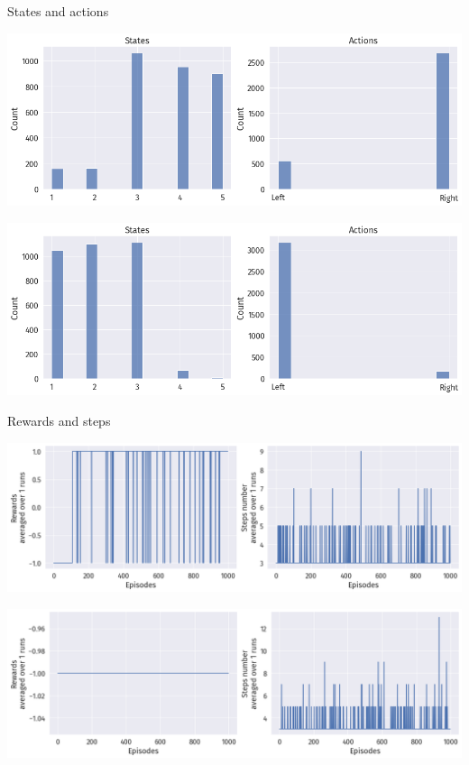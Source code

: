 \documentclass[bigger]{beamer}
\begin{document}
\begin{frame}[label={sec:org94344ed}]{States and actions}
\begin{center}
\includegraphics[width=.9\linewidth]{img/DRL-states-actions.png}
\end{center}
\begin{center}
\includegraphics[width=.9\linewidth]{img/DRL-states-actions2.png}
\end{center}
\end{frame}
\begin{frame}[label={sec:org10dfb92}]{Rewards and steps}
\begin{center}
\includegraphics[width=.9\linewidth]{img/DRL-rewards-steps.png}
\end{center}
\begin{center}
\includegraphics[width=.9\linewidth]{img/DRL-rewards-steps2.png}
\end{center}
\end{frame}
\end{document}
